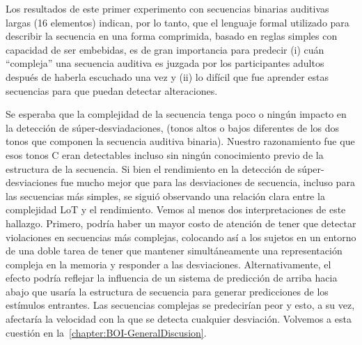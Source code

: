 Los resultados de este primer experimento con secuencias binarias auditivas largas (16 elementos) indican, por lo tanto, que el lenguaje formal utilizado para describir la secuencia en una forma comprimida, basado en reglas simples con capacidad de ser embebidas, es de gran importancia para predecir (i) cuán ``compleja'' una secuencia auditiva es juzgada por los participantes adultos después de haberla escuchado una vez y (ii) lo difícil que fue aprender estas secuencias para que puedan detectar alteraciones.


Se esperaba que la complejidad de la secuencia tenga poco o ningún impacto en la detección de súper-desviadaciones, (tonos altos o bajos diferentes de los dos tonos que componen la secuencia auditiva binaria). Nuestro razonamiento fue que esos tonos C eran detectables incluso sin ningún conocimiento previo de la estructura de la secuencia. Si bien el rendimiento en la detección de súper-desviaciones fue mucho mejor que para las desviaciones de secuencia, incluso para las secuencias más simples, se siguió observando una relación clara entre la complejidad LoT y el rendimiento. Vemos al menos dos interpretaciones de este hallazgo. Primero, podría haber un mayor costo de atención de tener que detectar violaciones en secuencias más complejas, colocando así a los sujetos en un entorno de una doble tarea de tener que mantener simultáneamente una representación compleja en la memoria y responder a las desviaciones. Alternativamente, el efecto podría reflejar la influencia de un sistema de predicción de arriba hacia abajo que usaría la estructura de secuencia para generar predicciones de los estímulos entrantes. Las secuencias complejas se predecirían peor y esto, a su vez, afectaría la velocidad con la que se detecta cualquier desviación. Volvemos a esta cuestión en la~\ref{chapter:BOI-GeneralDiscusion}.

